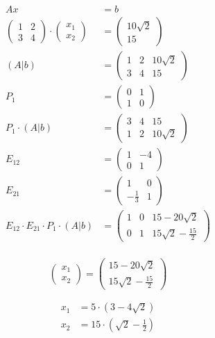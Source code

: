 \begin{align}
    Ax &= b \\
    \begin{pmatrix}
        1 & 2 \\
        3 & 4
    \end{pmatrix} \cdot \begin{pmatrix}
        x_1 \\
        x_2
    \end{pmatrix} &= \begin{pmatrix}
        10 \sqrt{2} \\
        15
    \end{pmatrix} \\
    \left( A | b \right) &= \left( \begin{array}{cc|c}
        1 & 2 & 10 \sqrt{2} \\
        3 & 4 & 15
    \end{array} \right) \\
    P_1 &= \begin{pmatrix}
        0 & 1 \\
        1 & 0
    \end{pmatrix} \\
    P_1 \cdot \left( A | b \right) &= \left( \begin{array}{cc|c}
        3 & 4 & 15 \\
        1 & 2 & 10 \sqrt{2}
    \end{array} \right) \\
    E_{12} &= \begin{pmatrix}
        1 & -4 \\
        0 & 1
    \end{pmatrix} \\
    E_{21} &= \begin{pmatrix}
        1 & 0 \\
        -\frac{1}{3} & 1
    \end{pmatrix} \\
    E_{12} \cdot E_{21} \cdot P_1 \cdot \left( A | b \right) &= \left( \begin{array}{cc|c}
        1 & 0 & 15 - 20\sqrt{2} \\
        0 & 1 & 15 \sqrt{2} - \frac{15}{2}
    \end{array} \right) \\
\end{align}

\begin{equation}
    \begin{pmatrix}
        x_1 \\
        x_2
    \end{pmatrix} = \begin{pmatrix}
        15 - 20\sqrt{2} \\
        15 \sqrt{2} - \frac{15}{2}
    \end{pmatrix}
\end{equation}

\begin{align}
    x_1 &= 5 \cdot (3 - 4\sqrt{2}) \\
    x_2 &= 15 \cdot (\sqrt{2} - \frac{1}{2})
\end{align}
